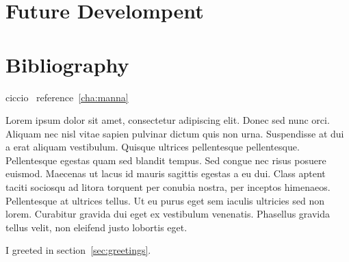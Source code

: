 \section{Future Develompent}
\section{Bibliography}

ciccio~\label{cha:manna}
reference~\ref{cha:manna}

Lorem ipsum dolor sit amet, consectetur adipiscing elit. Donec sed nunc orci. Aliquam nec nisl vitae sapien pulvinar dictum quis non urna. Suspendisse at dui a erat aliquam vestibulum. Quisque ultrices pellentesque pellentesque. Pellentesque egestas quam sed blandit tempus. Sed congue nec risus posuere euismod. Maecenas ut lacus id mauris sagittis egestas a eu dui. Class aptent taciti sociosqu ad litora torquent per conubia nostra, per inceptos himenaeos. Pellentesque at ultrices tellus. Ut eu purus eget sem iaculis ultricies sed non lorem. Curabitur gravida dui eget ex vestibulum venenatis. Phasellus gravida tellus velit, non eleifend justo lobortis eget. 


I greeted in section~\ref{sec:greetings}.